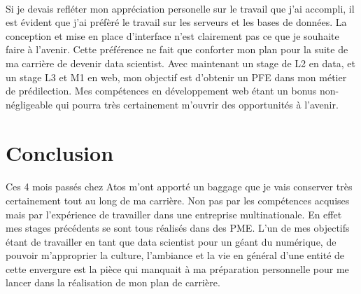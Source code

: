 \documentclass[12pt]{article}
\begin{document}
\begin {sloppypar}
\paragraph{}
Si je devais refléter mon appréciation personelle sur le travail que j'ai accompli, il est évident que j'ai préfèré
le travail sur les serveurs et les bases de données. La conception et mise en place d'interface n'est clairement pas ce 
que je souhaite faire à l'avenir. Cette préférence ne fait que conforter mon plan pour la suite de ma carrière 
de devenir data scientist. Avec maintenant un stage de L2 en data, et un stage L3 et M1 en web, mon objectif 
est d'obtenir un PFE dans mon métier de prédilection. Mes compétences en développement web étant un bonus
non-négligeable qui pourra très certainement m'ouvrir des opportunités à l'avenir.

\section{Conclusion}
\paragraph{}
Ces 4 mois passés chez Atos m'ont apporté un baggage que je vais conserver très certainement tout 
au long de ma carrière. Non pas par les compétences acquises mais par l'expérience de travailler 
dans une entreprise multinationale. En effet mes stages précédents se sont tous réalisés dans des PME. 
L'un de mes objectifs étant de travailler en tant que data scientist pour un géant du numérique, 
de pouvoir m'approprier la culture, l'ambiance et la vie en général d'une entité de cette envergure
est la pièce qui manquait à ma préparation personnelle pour me lancer dans la réalisation de mon plan de carrière. 

\newpage

\end{sloppypar}
\end{document}
